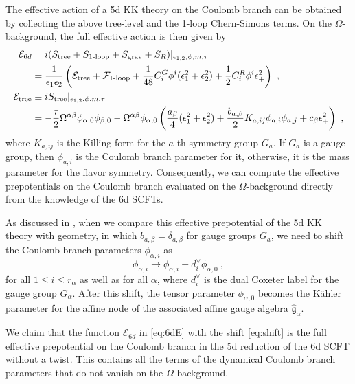 The effective action of a 5d KK theory on the Coulomb branch can be obtained by collecting the above tree-level and the 1-loop Chern-Simons terms. On the $\Omega$-background, the full effective action is then given by
\begin{align}\label{eq:6dE}
	\mathcal{E}_{6d} &= i(S_{\rm tree} + S_{\text{1-loop}} + S_{\rm grav} + S_R) |_{\epsilon_{1,2},\phi,m,\tau} \nonumber \\
	&= \frac{1}{\epsilon_1\epsilon_2}\left(\mathcal{E}_{\rm tree}+\mathcal{F}_{\text{1-loop}}+\frac{1}{48} C^G_i\phi^i (\epsilon_1^2+\epsilon_2^2) + \frac{1}{2}C_i^R \phi^i\epsilon_+^2\right) \ ,  \\
	\mathcal{E}_{\rm tree} &\equiv iS_{\rm tree}|_{\epsilon_{1,2},\phi,m,\tau}\cr
	&= -\frac{\tau}{2}\Omega^{\alpha\beta}\phi_{\alpha,0}\phi_{\beta,0} - \Omega^{\alpha\beta}\phi_{\alpha,0}\left(\frac{a_\beta}{4}(\epsilon_1^2+\epsilon_2^2)+\frac{b_{a,\beta}}{2}K_{a,ij}\phi_{a,i}\phi_{a,j}+c_\beta \epsilon_+^2\right) \nonumber \ ,
\end{align}
where $K_{a,ij}$ is the Killing form for the $a$-th symmetry group $G_a$. If $G_a$ is a gauge group, then $\phi_{a,i}$ is the Coulomb branch parameter for it, otherwise, it is the mass parameter for the flavor symmetry. Consequently, we can compute the effective prepotentials on the Coulomb branch evaluated on the $\Omega$-background directly from the knowledge of the 6d SCFTs.

As discussed in \cite{Bhardwaj:2019fzv}, when we compare this effective prepotential of the 5d KK theory with geometry, in which $b_{a,\beta}=\delta_{a,\beta}$ for gauge groups $G_a$, we need to shift the Coulomb branch parameters $\phi_{\alpha,i}$ as
\begin{equation}\label{eq:shift}
	\phi_{\alpha,i} \rightarrow \phi_{\alpha,i} - d_i^{\vee} \phi_{\alpha,0} \ ,
\end{equation}
for all $1\le i \le r_\alpha$ as well as for all $\alpha$, where $d_i^{\vee}$ is the dual Coxeter label for the gauge group $G_\alpha$. After this shift, the tensor parameter $\phi_{\alpha,0}$ becomes the K\"ahler parameter for the affine node of the associated affine gauge algebra $\hat{\mathfrak{g}}_\alpha$.

We claim that the function $\mathcal{E}_{6d}$ in \eqref{eq:6dE} with the shift \eqref{eq:shift} is the full effective prepotential on the Coulomb branch in the 5d reduction of the 6d SCFT without a twist. This contains all the terms of the dynamical Coulomb branch parameters that do not vanish on the $\Omega$-background.

